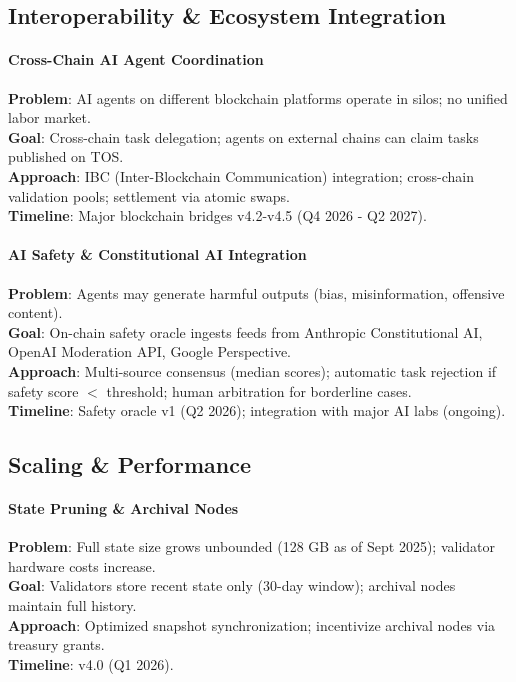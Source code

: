 \documentclass[11pt]{article}
\begin{document}
\subsection{Interoperability \& Ecosystem Integration}

\paragraph{Cross-Chain AI Agent Coordination}
\textbf{Problem}: AI agents on different blockchain platforms operate in silos; no unified labor market.\\
\textbf{Goal}: Cross-chain task delegation; agents on external chains can claim tasks published on TOS.\\
\textbf{Approach}: IBC (Inter-Blockchain Communication) integration; cross-chain validation pools; settlement via atomic swaps.\\
\textbf{Timeline}: Major blockchain bridges v4.2-v4.5 (Q4 2026 - Q2 2027).

\paragraph{AI Safety \& Constitutional AI Integration}
\textbf{Problem}: Agents may generate harmful outputs (bias, misinformation, offensive content).\\
\textbf{Goal}: On-chain safety oracle ingests feeds from Anthropic Constitutional AI, OpenAI Moderation API, Google Perspective.\\
\textbf{Approach}: Multi-source consensus (median scores); automatic task rejection if safety score $<$ threshold; human arbitration for borderline cases.\\
\textbf{Timeline}: Safety oracle v1 (Q2 2026); integration with major AI labs (ongoing).

\subsection{Scaling \& Performance}

\paragraph{State Pruning \& Archival Nodes}
\textbf{Problem}: Full state size grows unbounded (128 GB as of Sept 2025); validator hardware costs increase.\\
\textbf{Goal}: Validators store recent state only (30-day window); archival nodes maintain full history.\\
\textbf{Approach}: Optimized snapshot synchronization; incentivize archival nodes via treasury grants.\\
\textbf{Timeline}: v4.0 (Q1 2026).
\end{document}
